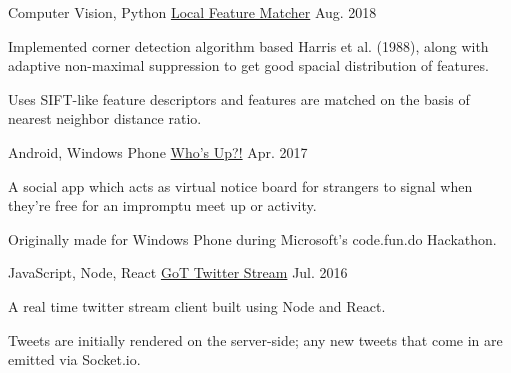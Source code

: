 

\begin{cventries}

  \cventry
    {Computer Vision, Python} %
    {\href{}{Local Feature Matcher}} %
    {} %
    {Aug. 2018} %
    {
      \begin{cvitems} %
        \item {Implemented corner detection algorithm based Harris et al. (1988), along with adaptive non-maximal suppression to get good spacial distribution of features.}
        \item {Uses SIFT-like feature descriptors and features are matched on the basis of nearest neighbor distance ratio.}
      \end{cvitems}
    }

  \cventry
    {Android, Windows Phone} %
    {\href{https://github.com/Whos-Up-Team/WhosUp}{Who's Up?!}} %
    {} %
    {Apr. 2017} %
    {
      \begin{cvitems} %
        \item {A social app which acts as virtual notice board for strangers to signal when they're free for an impromptu meet up or activity.}
    \item {Originally made for Windows Phone during Microsoft's code.fun.do Hackathon.}
      \end{cvitems}
    }

  \cventry
    {JavaScript, Node, React} %
    {\href{https://github.com/azwreith/got-twitter-stream}{GoT Twitter Stream}} %
    {} %
    {Jul. 2016} %
    {
      \begin{cvitems} %
        \item {A real time twitter stream client built using Node and React.}
        \item {Tweets are initially rendered on the server-side; any new tweets that come in are emitted via Socket.io.}
      \end{cvitems}
    }

\end{cventries}

